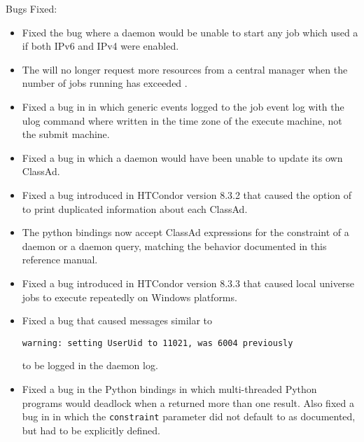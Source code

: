 \noindent Bugs Fixed:

\begin{itemize}

\item Fixed the bug where a  daemon would be unable to start
any job which used a  if both IPv6 and IPv4 were enabled.

\item The  will no longer request more resources from
a central manager when the number of jobs running has exceeded
.

\item Fixed a bug in  in which generic events logged
to the job event log with the ulog command where written in the time zone
of the execute machine, not the submit machine.

\item Fixed a bug in which a  daemon would have been unable 
to update its own ClassAd.

\item Fixed a bug introduced in HTCondor version 8.3.2 that caused the 
 option of  to print duplicated information 
about each ClassAd.

\item The python bindings now accept ClassAd expressions for the constraint
of a  daemon or a  daemon query, 
matching the behavior documented in this reference manual.

\item Fixed a bug introduced in HTCondor version 8.3.3 that caused 
local universe jobs to execute repeatedly on Windows platforms.

\item Fixed a bug that caused messages similar to
\begin{verbatim}
warning: setting UserUid to 11021, was 6004 previously
\end{verbatim}
to be logged in the  daemon log. 

\item Fixed a bug in the Python bindings in which multi-threaded Python
programs would deadlock when a  returned more than
one result.
Also fixed a bug in  in which
the \texttt{constraint} parameter did not default to  as documented,
but had to be explicitly defined.

\end{itemize}

